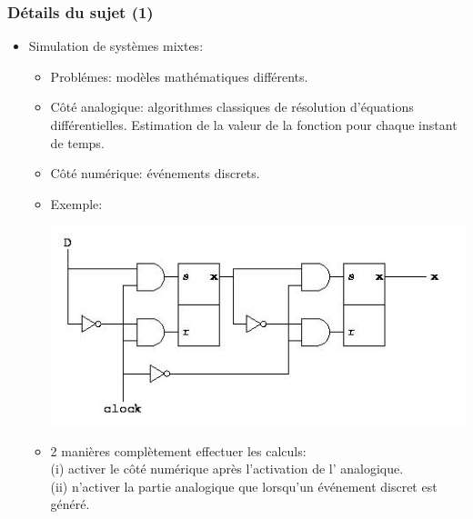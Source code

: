 \documentclass[10pt]{beamer}
\begin{document}
\begin{frame}
\frametitle{Détails du sujet (1)}

\begin{itemize}

  \item Simulation de systèmes mixtes: 

  \begin{itemize}
    
    	\item Problémes: modèles mathématiques différents. 
    	\item Côté analogique: algorithmes classiques de résolution d'équations
    	différentielles. Estimation de la valeur de la fonction pour chaque
    	instant de temps.  
    	\item Côté numérique: événements discrets. 
    	\item Exemple:
    	
    	\begin {center} \includegraphics[scale=0.38]{images/analo} \end {center}
    	
    	\item 2 manières complètement effectuer les calculs: \\ (i) activer
    	le côté numérique après l'activation de l' analogique. \\  (ii)
    	n'activer la partie analogique que lorsqu'un événement discret est généré.
     
  \end{itemize}
  
\end{itemize}

\end{frame}
\end{document}
